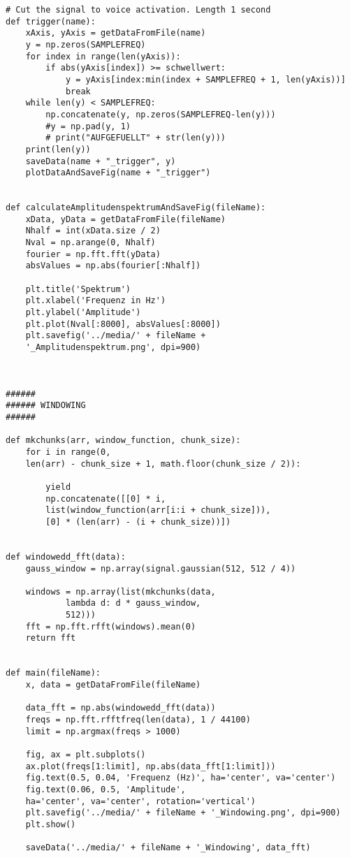 \documentclass[12pt, oneside, a4paper, \docLanguage]{report}
\begin{document}
\begin{verbatim}
# Cut the signal to voice activation. Length 1 second
def trigger(name):
    xAxis, yAxis = getDataFromFile(name)
    y = np.zeros(SAMPLEFREQ)
    for index in range(len(yAxis)):
        if abs(yAxis[index]) >= schwellwert:
            y = yAxis[index:min(index + SAMPLEFREQ + 1, len(yAxis))]
            break
    while len(y) < SAMPLEFREQ:
        np.concatenate(y, np.zeros(SAMPLEFREQ-len(y)))
        #y = np.pad(y, 1)
        # print("AUFGEFUELLT" + str(len(y)))
    print(len(y))
    saveData(name + "_trigger", y)
    plotDataAndSaveFig(name + "_trigger")


def calculateAmplitudenspektrumAndSaveFig(fileName):
    xData, yData = getDataFromFile(fileName)
    Nhalf = int(xData.size / 2)
    Nval = np.arange(0, Nhalf)
    fourier = np.fft.fft(yData)
    absValues = np.abs(fourier[:Nhalf])

    plt.title('Spektrum')
    plt.xlabel('Frequenz in Hz')
    plt.ylabel('Amplitude')
    plt.plot(Nval[:8000], absValues[:8000])
    plt.savefig('../media/' + fileName + 
    '_Amplitudenspektrum.png', dpi=900)



######
###### WINDOWING
######

def mkchunks(arr, window_function, chunk_size):
    for i in range(0, 
    len(arr) - chunk_size + 1, math.floor(chunk_size / 2)):
    
        yield 
        np.concatenate([[0] * i, 
        list(window_function(arr[i:i + chunk_size])), 
        [0] * (len(arr) - (i + chunk_size))])


def windowedd_fft(data):
    gauss_window = np.array(signal.gaussian(512, 512 / 4))

    windows = np.array(list(mkchunks(data, 
    		lambda d: d * gauss_window, 
    		512)))
    fft = np.fft.rfft(windows).mean(0)
    return fft


def main(fileName):
    x, data = getDataFromFile(fileName)

    data_fft = np.abs(windowedd_fft(data))
    freqs = np.fft.rfftfreq(len(data), 1 / 44100)
    limit = np.argmax(freqs > 1000)

    fig, ax = plt.subplots()
    ax.plot(freqs[1:limit], np.abs(data_fft[1:limit]))
    fig.text(0.5, 0.04, 'Frequenz (Hz)', ha='center', va='center')
    fig.text(0.06, 0.5, 'Amplitude', 
    ha='center', va='center', rotation='vertical')
    plt.savefig('../media/' + fileName + '_Windowing.png', dpi=900)
    plt.show()

    saveData('../media/' + fileName + '_Windowing', data_fft)

\end{verbatim}
\end{document}
